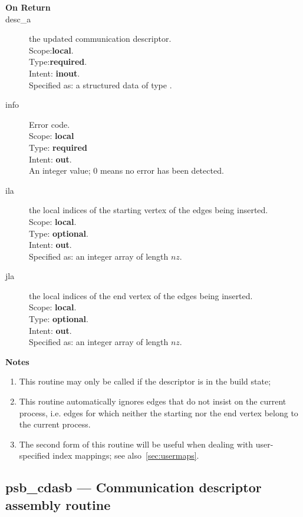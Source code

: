 \begin{description}
\item[\bf On Return]
\item[desc\_a] the updated communication descriptor.\\
Scope:{\bf local}.\\
Type:{\bf required}.\\
Intent: {\bf inout}.\\
Specified as: a structured data of type \descdata.
\item[info] Error code.\\
Scope: {\bf local} \\
Type: {\bf required} \\
Intent: {\bf out}.\\
An integer value; 0 means no error has been detected. 
\item[ila] the local indices of the starting vertex of the edges  being inserted.\\
Scope: {\bf local}.\\
Type: {\bf optional}.\\
Intent: {\bf out}.\\
Specified as: an integer array of length $nz$.
\item[jla]  the local indices of the end vertex of the edges  being inserted.\\
Scope: {\bf local}.\\
Type: {\bf optional}.\\
Intent: {\bf out}.\\
Specified as: an integer array of length $nz$.

\end{description}
{\par\noindent\large\bfseries Notes}
\begin{enumerate}
\item This routine may only be called if the descriptor is in the
  build state;
\item  This routine automatically ignores edges that do not
insist on the  current process, i.e. edges for which neither the starting
nor the end vertex belong to the current process.
\item The second form of this routine will be useful when dealing with
  user-specified index mappings; see also~\ref{sec:usermaps}.
\end{enumerate}



%
%
\clearpage\subsection{psb\_cdasb --- Communication descriptor assembly
  routine}

